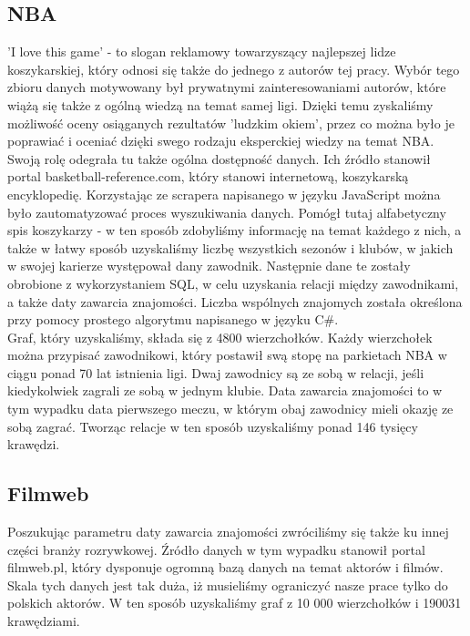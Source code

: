 \documentclass{article}
\begin{document}
\subsection{NBA}
'I love this game' - to slogan reklamowy towarzyszący najlepszej lidze koszykarskiej, który odnosi się także do jednego z autorów tej pracy. Wybór tego zbioru danych motywowany był prywatnymi zainteresowaniami autorów, które wiążą się także z ogólną wiedzą na temat samej ligi. Dzięki temu zyskaliśmy możliwość oceny osiąganych rezultatów 'ludzkim okiem', przez co można było je poprawiać i oceniać dzięki swego rodzaju eksperckiej wiedzy na temat NBA.\\

Swoją rolę odegrała tu także ogólna dostępność danych. Ich źródło stanowił portal basketball-reference.com, który stanowi internetową, koszykarską encyklopedię. Korzystając ze scrapera napisanego w języku JavaScript można było zautomatyzować proces wyszukiwania danych. Pomógł tutaj alfabetyczny spis koszykarzy - w ten sposób zdobyliśmy informację na temat każdego z nich, a także w łatwy sposób uzyskaliśmy liczbę wszystkich sezonów i klubów, w jakich w swojej karierze występował dany zawodnik. Następnie dane te zostały obrobione z wykorzystaniem SQL, w celu uzyskania relacji między zawodnikami, a także daty zawarcia znajomości. Liczba wspólnych znajomych została określona przy pomocy prostego algorytmu napisanego w języku C\#.\\

Graf, który uzyskaliśmy, składa się z 4800 wierzchołków. Każdy wierzchołek można przypisać zawodnikowi, który postawił swą stopę na parkietach NBA w ciągu ponad 70 lat istnienia ligi. Dwaj zawodnicy są ze sobą w relacji, jeśli kiedykolwiek zagrali ze sobą w jednym klubie. Data zawarcia znajomości to w tym wypadku data pierwszego meczu, w którym obaj zawodnicy mieli okazję ze sobą zagrać. Tworząc relacje w ten sposób uzyskaliśmy ponad 146 tysięcy krawędzi.

\subsection{Filmweb}
Poszukując parametru daty zawarcia znajomości zwróciliśmy się także ku innej części branży rozrywkowej. Źródło danych w tym wypadku stanowił portal filmweb.pl, który dysponuje ogromną bazą danych na temat aktorów i filmów. Skala tych danych jest tak duża, iż musieliśmy ograniczyć nasze prace tylko do polskich aktorów. W ten sposób uzyskaliśmy graf z 10 000 wierzchołków i 190031 krawędziami.\\
\end{document}
